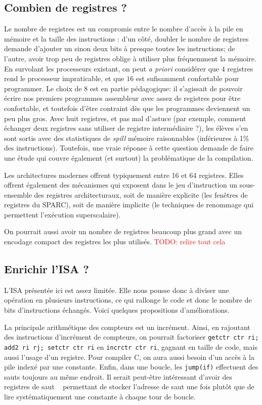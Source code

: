 \documentclass[architecture]{compas2018}
\newcommand{\todo}[1]{\textcolor{red}{TODO: #1}}
\begin{document}
\subsection{Combien de registres ?}
Le nombre de registres est un compromis entre le nombre d'accès à la pile en mémoire et la taille des instructions :
d'un côté, doubler le nombre de registres demande d'ajouter un sinon deux bits à presque toutes les instructions;
de l'autre, avoir trop peu de registres oblige à utiliser plus fréquemment la mémoire.
En survolant les processeurs existant, on peut {\it a priori} considérer que $4$ registres rend le processeur impraticable, et que $16$ est sufisamment confortable pour programmer.
Le choix de 8 est en partie pédagogique: il s'agissait de pouvoir écrire nos premiers programmes assembleur avec assez de registres pour être confortable, et toutefois d'être contraint dès que les programmes deviennent un peu plus gros. 
Avec huit registres, et pas mal d'astuce (par exemple, comment échanger deux registres sans utiliser de registre intermédiaire ?), les élèves s'en sont sortis avec des statistiques de \emph{spill} mémoire raisonnables (inférieures à 1\% des instructions).
Toutefois, une vraie réponse à cette question demande de faire une étude qui couvre également (et surtout) la problématique de la compilation.

Les architectures modernes offrent typiquement entre 16 et 64 registres.
Elles offrent également des mécanismes qui exposent dans le jeu d'instruction un sous-ensemble des registres architecturaux, soit de manière explicite (les fenêtres de registres du SPARC), soit de manière implicite (le techniques de renommage qui permettent l'exécution superscalaire).

On pourrait aussi avoir un nombre de registres beaucoup plus grand avec un encodage compact des registres les plus utilisés.
\todo{relire tout cela}

\subsection{Enrichir l'ISA ?}

L'ISA présentée ici est assez limitée. Elle nous pousse donc à diviser une opération en plusieurs instructions, ce qui rallonge le code et donc le nombre de bits d'instructions échangés. Voici quelques propositions d'améliorations.\par
La principale arithmétique des compteurs est un incrément. Ainsi, en rajoutant des instructions d'incrément de compteurs, on pourrait factoriser \texttt{getctr ctr ri; add2 ri rj; setctr ctr ri} en \texttt{incrctr ctr ri}, gagnant en taille de code, mais aussi l'usage d'un registre. Pour compiler C, on aura aussi besoin d'un accès à la pile indexé par une constante. Enfin, dans une boucle, les \texttt{jump(if)} effectuent des sauts toujours au même endroit. Il serait peut-être intéressant d'avoir des registres \og{} de saut \ \fg{} permettant de stocker l'adresse de saut une fois plutôt que de lire systématiquement une constante à chaque tour de boucle.  
\end{document}
